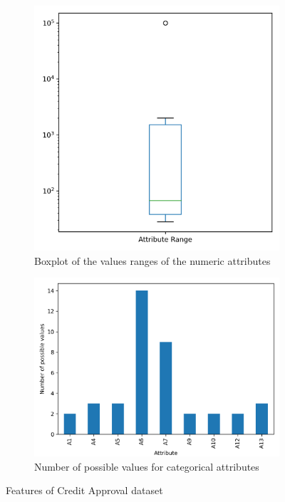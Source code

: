 \documentclass[a4paper,11pt]{article}
\begin{document}
    \begin{figure}[h!]
        \centering
        \begin{subfigure}[c]{0.4\textwidth}
            \centering
            \includegraphics[width=1\textwidth]{exercise_1/paper/figures/credit_approval_continous_range_plot.png}
            \caption{Boxplot of the values ranges of the numeric attributes}
            \label{fig:credit-approval_numeric-attributes}
        \end{subfigure}
        \begin{subfigure}[c]{0.5\textwidth}
            \centering
            \includegraphics[width=1.1\textwidth]{exercise_1/paper/figures/credit_approval_categories_bar.png}
            \caption{Number of possible values for categorical attributes}
            \label{fig:credit-approval_categorical_attributes}
        \end{subfigure}
        \caption{Features of Credit Approval dataset}
        \label{fig:credit-approval_attributes}
    \end{figure}
    
\end{document}
